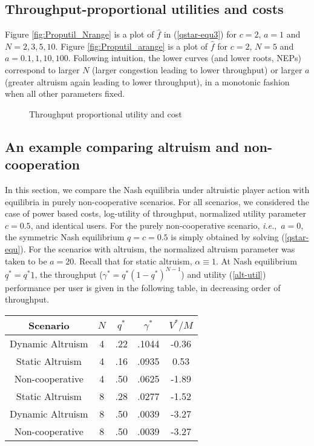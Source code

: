 \documentclass[12pt,onecolumn,draftcls]{IEEEtran}
\newcommand{\ie}{{\em i.e.},~}
\newcommand{\uq}{\underline{q}}
\newcommand{\uone}{\underline{1}}
\begin{document}
\subsection{Throughput-proportional utilities and costs}
Figure \ref{fig:Proputil_Nrange} is a plot of $\hat{f}$ in
(\ref{qstar-equ3}) for $c=2$, $a=1$ and $N=2,3,5,10$.  Figure
\ref{fig:Proputil_arange} is a plot of $\hat{f}$ for $c=2$, $N=5$ and
$a=0.1,1,10,100$.  Following intuition, the lower curves (and lower roots,
NEPs) correspond to larger $N$ (larger congestion leading to lower
throughput) or larger $a$ (greater altruism again leading to lower
throughput), in a monotonic fashion when all other parameters fixed.

\begin{figure}[ht]
\centering
{}
\caption{Throughput proportional utility and cost}\label{fig:Proputil}
\end{figure}


\subsection{An example comparing altruism and non-cooperation}\label{anarchy-sec}

In this section, we compare the Nash equilibria under altruistic player
action with equilibria in purely non-cooperative scenarios.  For all
scenarios, we considered the case of power based costs, log-utility of
throughput, normalized utility parameter $c =0.5$, and identical users.
For the purely non-cooperative scenario, \ie $a=0$, the symmetric Nash
equilibrium $q=c=0.5$ is simply obtained by solving (\ref{qstar-equ}).  For
the scenarios with altruism,  the normalized altruism parameter was taken
to be $a=20$.  Recall that for static altruism, $\alpha\equiv 1$.  At Nash
equilibrium $\uq^*=q^*\uone$, the throughput ($\gamma^*=q^*(1-q^*)^{N-1}$)
and utility (\ref{alt-util}) performance per user is given in the following
table, in decreasing order of throughput.








\begin{tabular}{c|c|c|c|c}
Scenario & $N$ & $q^*$ & $\gamma^*$  &  $V^*/M$ \\ \hline
Dynamic Altruism & 4 & .22 & .1044 & -0.36 \\
Static Altruism & 4 & .16 & .0935 &  0.53 \\
Non-cooperative   & 4 & .50 & .0625 & -1.89 \\
Static Altruism & 8 & .28 & .0277 & -1.52 \\
Dynamic Altruism & 8 & .50 & .0039 & -3.27 \\
Non-cooperative   & 8 & .50 & .0039 & -3.27 
\end{tabular}
\end{document}
